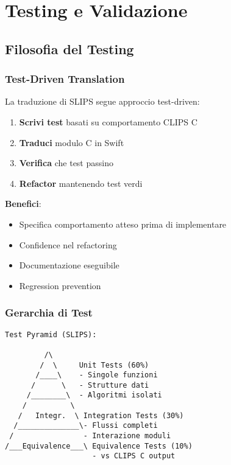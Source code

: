 
\chapter{Testing e Validazione}
\label{cap:testing}

\section{Filosofia del Testing}

\subsection{Test-Driven Translation}

La traduzione di SLIPS segue approccio test-driven:

\begin{enumerate}
\item \textbf{Scrivi test} basati su comportamento CLIPS C
\item \textbf{Traduci} modulo C in Swift
\item \textbf{Verifica} che test passino
\item \textbf{Refactor} mantenendo test verdi
\end{enumerate}

\textbf{Benefici}:
\begin{itemize}
\item Specifica comportamento atteso prima di implementare
\item Confidence nel refactoring
\item Documentazione eseguibile
\item Regression prevention
\end{itemize}

\subsection{Gerarchia di Test}

\begin{verbatim}
Test Pyramid (SLIPS):

         /\
        /  \     Unit Tests (60%)
       /____\    - Singole funzioni
      /      \   - Strutture dati
     /________\  - Algoritmi isolati
    /          \
   /   Integr.  \ Integration Tests (30%)
  /______________\- Flussi completi
 /                - Interazione moduli
/___Equivalence___\ Equivalence Tests (10%)
                    - vs CLIPS C output
\end{verbatim}

